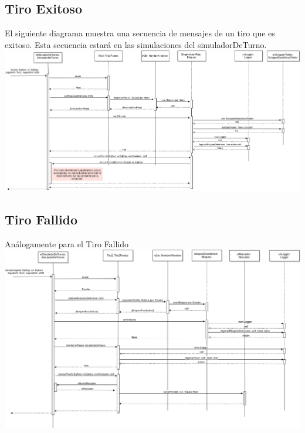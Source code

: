\subsection{Tiro Exitoso}
El siguiente diagrama muestra una secuencia de mensajes de un tiro que es exitoso. Esta secuencia estará en las simulaciones del simuladorDeTurno.
\includegraphics[width=\textwidth]{imgs/TiroExitoso.png}
\subsection{Tiro Fallido}
Análogamente para el Tiro Fallido
\includegraphics[width=\textwidth]{imgs/TiroFallido.png}

